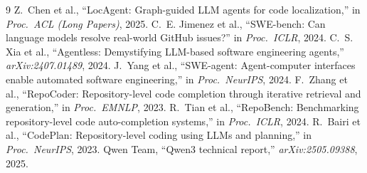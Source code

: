 \begin{thebibliography}{9}
 Z.~Chen et al., ``LocAgent: Graph-guided LLM agents
for code localization,'' in \emph{Proc.\ ACL (Long Papers)}, 2025.
 C.~E. Jimenez et al., ``SWE-bench: Can language
models resolve real-world GitHub issues?'' in \emph{Proc.\ ICLR}, 2024.
 C.~S. Xia et al., ``Agentless: Demystifying
LLM-based software engineering agents,'' \emph{arXiv:2407.01489}, 2024.
 J.~Yang et al., ``SWE-agent: Agent-computer
interfaces enable automated software engineering,'' in \emph{Proc.\ NeurIPS},
2024.
 F.~Zhang et al., ``RepoCoder: Repository-level
code completion through iterative retrieval and generation,'' in
\emph{Proc.\ EMNLP}, 2023.
 R.~Tian et al., ``RepoBench: Benchmarking
repository-level code auto-completion systems,'' in \emph{Proc.\ ICLR}, 2024.
 R.~Bairi et al., ``CodePlan: Repository-level
coding using LLMs and planning,'' in \emph{Proc.\ NeurIPS}, 2023.
 Qwen Team, ``Qwen3 technical report,''
\emph{arXiv:2505.09388}, 2025.
\end{thebibliography}